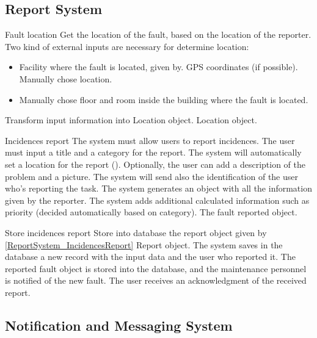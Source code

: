\subsection{Report System}

\begin{requirement}{Fault location}
\label{reqFaultLocation}
\reqdesc Get the location of the fault, based on the location of the reporter.
\reqin Two kind of external inputs are necessary for determine location:
\begin{itemize}
\item Facility where the fault is located, given by.
\subitem GPS coordinates (if possible).
\subitem Manually chose location.
\item Manually chose floor and room inside the building where the fault is located.
\end{itemize}
\reqsteps Transform input information into Location object.
\reqout Location object.
\end{requirement}

\begin{requirement}{Incidences report}\label{ReportSystem_IncidencesReport}
\reqdesc The system must allow users to report incidences.
\reqin The user must input a title and a category for the report. The system will automatically set a location for the report (). Optionally, the user can add a description of the problem and a picture. The system will send also the identification of the user who's reporting the task.
\reqsteps The system generates an object with all the information given by the reporter. The system adds additional calculated information such as priority (decided automatically based on category).
\reqout The fault reported object.
\end{requirement}

\begin{requirement}{Store incidences report}
\reqdesc Store into database the report object given by \ref{ReportSystem_IncidencesReport}
\reqin Report object.
\reqdesc The system saves in the database a new record with the input data and the user who reported it.
\reqout The reported fault object is stored into the database, and the maintenance personnel is notified of the new fault. The user receives an acknowledgment of the received report.
\end{requirement}

\subsection{Notification and Messaging System}


